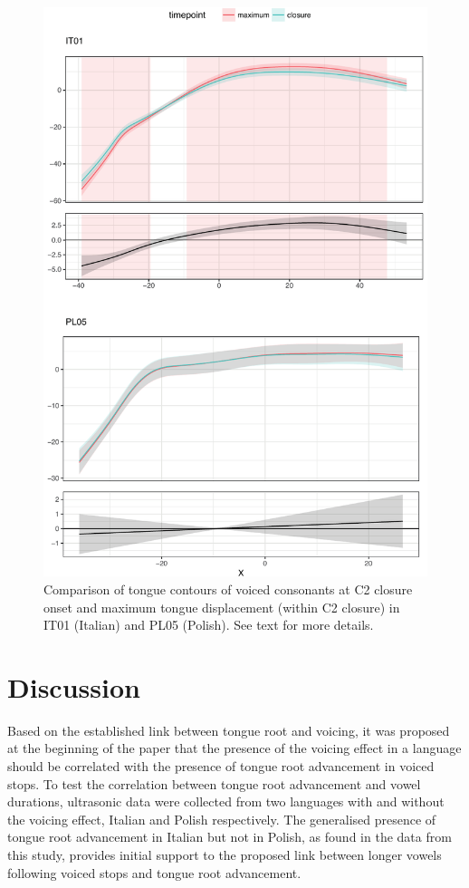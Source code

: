 \documentclass[authoryear, twocolumn]{elsarticle}
\begin{document}
\begin{figure}
    \centering
    \includegraphics[height=.9\textheight]{fig/voiced.pdf}
    \caption{Comparison of tongue contours of voiced consonants at C2 closure onset and maximum tongue displacement (within C2 closure) in IT01 (Italian) and PL05 (Polish). See text for more details.}
    \label{f:voiced}
\end{figure}

\section{Discussion}\label{discussion}

\label{s:discussion}

Based on the established link between tongue root and voicing, it was
proposed at the beginning of the paper that the presence of the voicing
effect in a language should be correlated with the presence of tongue
root advancement in voiced stops. To test the correlation between tongue
root advancement and vowel durations, ultrasonic data were collected
from two languages with and without the voicing effect, Italian and
Polish respectively. The generalised presence of tongue root advancement
in Italian but not in Polish, as found in the data from this study,
provides initial support to the proposed link between longer vowels
following voiced stops and tongue root advancement.
\end{document}
